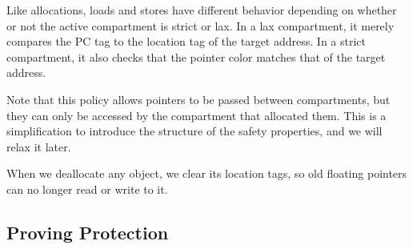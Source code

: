 \documentclass{article}
\begin{document}
Like allocations, loads and stores have different behavior depending on whether or not the active
compartment is strict or lax. In a lax compartment, it merely compares the PC tag to the location
tag of the target address. In a strict compartment, it also checks that the pointer color matches
that of the target address.

\hspace{-5em}
\begin{minipage}{0.55\textwidth}
\end{minipage}
\begin{minipage}{0.44\textwidth}
\end{minipage}

Note that this policy allows pointers to be passed between compartments, but they can only
be accessed by the compartment that allocated them. This is a simplification to introduce
the structure of the safety properties, and we will relax it later.

When we deallocate any object, we clear its location tags, so old floating pointers
can no longer read or write to it.

\subsection{Proving Protection}

\end{document}
